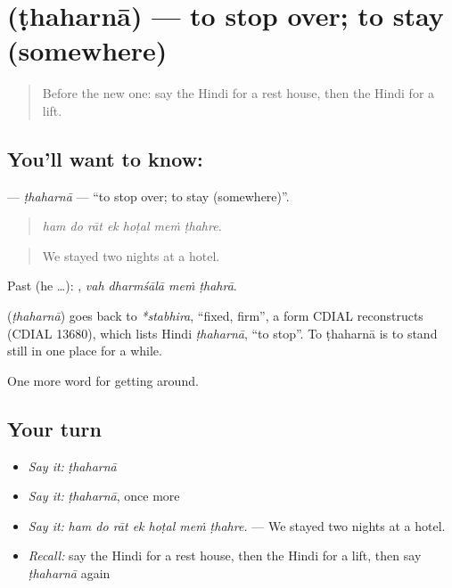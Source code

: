 \section[\texorpdfstring{\hi{ठहरना} (ṭhaharnā)}{ठहरना (ṭhaharnā)}]{ (ṭhaharnā) — to stop over; to stay (somewhere)}

\label{lesson:HI-C413-thaharna}



\begin{quote}
Before the new one: say the Hindi for a rest house, then the Hindi for a lift.
\end{quote}

\subsection*{You'll want to know: }
\textbf{} — \emph{ṭhaharnā} — \textquotedblleft{}to stop over; to stay (somewhere)\textquotedblright{}.

\begin{quote}
      
\end{quote}

\begin{quote}
\emph{ham do rāt ek hoṭal meṁ ṭhahre.}
\end{quote}

\begin{quote}
We stayed two nights at a hotel.
\end{quote}

Past (he …):    , \emph{vah dharmśālā meṁ ṭhahrā}.

\begin{cousinweb}
\textbf{} (\emph{ṭhaharnā}) goes back to \emph{*stabhira}, \textquotedblleft{}fixed, firm\textquotedblright{}, a form CDIAL reconstructs (CDIAL 13680), which lists Hindi \emph{ṭhaharnā}, \textquotedblleft{}to stop\textquotedblright{}. To ṭhaharnā is to stand still in one place for a while.
\end{cousinweb}

\begin{grammarlens}[title={What you've built}]
One more word for getting around.
\end{grammarlens}

\subsection*{Your turn}
\begin{itemize}
\raggedright
  \item \emph{Say it:} \emph{ṭhaharnā}
  \item \emph{Say it:} \emph{ṭhaharnā}, once more
  \item \emph{Say it:} \emph{ham do rāt ek hoṭal meṁ ṭhahre.} — We stayed two nights at a hotel.
  \item \emph{Recall:} say the Hindi for a rest house, then the Hindi for a lift, then say \emph{ṭhaharnā} again
\end{itemize}

